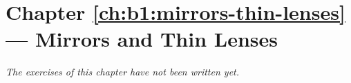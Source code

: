 \section*{Chapter \ref{ch:b1:mirrors-thin-lenses} --- Mirrors and Thin Lenses}


\emph{The exercises of this chapter have not been written yet.}
